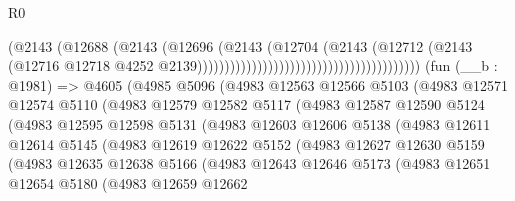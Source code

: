 \begin{lexlean}{R0}
\begin{coremodule}
                                                                  (@2143
                                                                    (@12688
                                                                      (@2143
                                                                        (@12696
                                                                          (@2143
                                                                            (@12704
                                                                              (@2143
                                                                                (@12712
                                                                                  (@2143
                                                                                    (@12716
                                                                                      @12718
                                                                                      @4252
                                                                                      @2139)))))))))))))))))))))))))))))))))))))))))
    (fun (__b : @1981) =>
    @4605
      (@4985
        @5096
        (@4983
          @12563
          @12566
          @5103
          (@4983
            @12571
            @12574
            @5110
            (@4983
              @12579
              @12582
              @5117
              (@4983
                @12587
                @12590
                @5124
                (@4983
                  @12595
                  @12598
                  @5131
                  (@4983
                    @12603
                    @12606
                    @5138
                    (@4983
                      @12611
                      @12614
                      @5145
                      (@4983
                        @12619
                        @12622
                        @5152
                        (@4983
                          @12627
                          @12630
                          @5159
                          (@4983
                            @12635
                            @12638
                            @5166
                            (@4983
                              @12643
                              @12646
                              @5173
                              (@4983
                                @12651
                                @12654
                                @5180
                                (@4983
                                  @12659
                                  @12662

\end{coremodule}
\end{lexlean}

